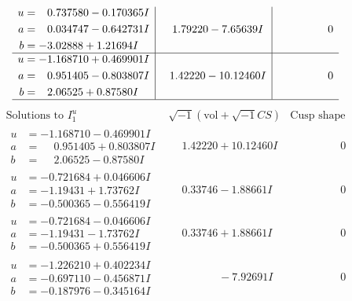 \documentclass[1p]{elsarticle_modified}
\theoremstyle{definition}
\newcommand{\I}{\sqrt{-1}}
\begin{document}
$$\begin{array}{c|c|c}
\begin{aligned}
u &= \phantom{-}0.737580 - 0.170365 I \\
a &= \phantom{-}0.034747 - 0.642731 I \\
b &= -3.02888 + 1.21694 I\end{aligned}
 & \phantom{-}1.79220 - 7.65639 I & \phantom{-0.000000 } 0 \\ \hline\begin{aligned}
u &= -1.168710 + 0.469901 I \\
a &= \phantom{-}0.951405 - 0.803807 I \\
b &= \phantom{-}2.06525 + 0.87580 I\end{aligned}
 & \phantom{-}1.42220 - 10.12460 I & \phantom{-0.000000 } 0\\
 \hline 
 \end{array}$$\newpage$$\begin{array}{c|c|c}  
\text{Solutions to }I^u_{1}& \I (\text{vol} + \sqrt{-1}CS) & \text{Cusp shape}\\
 \hline 
\begin{aligned}
u &= -1.168710 - 0.469901 I \\
a &= \phantom{-}0.951405 + 0.803807 I \\
b &= \phantom{-}2.06525 - 0.87580 I\end{aligned}
 & \phantom{-}1.42220 + 10.12460 I & \phantom{-0.000000 } 0 \\ \hline\begin{aligned}
u &= -0.721684 + 0.046606 I \\
a &= -1.19431 + 1.73762 I \\
b &= -0.500365 - 0.556419 I\end{aligned}
 & \phantom{-}0.33746 - 1.88661 I & \phantom{-0.000000 } 0 \\ \hline\begin{aligned}
u &= -0.721684 - 0.046606 I \\
a &= -1.19431 - 1.73762 I \\
b &= -0.500365 + 0.556419 I\end{aligned}
 & \phantom{-}0.33746 + 1.88661 I & \phantom{-0.000000 } 0 \\ \hline\begin{aligned}
u &= -1.226210 + 0.402234 I \\
a &= -0.697110 - 0.456871 I \\
b &= -0.187976 - 0.345164 I\end{aligned}
 & \phantom{-0.000000 } -7.92691 I & \phantom{-0.000000 } 0 \\ \hline\begin{aligned}

\end{aligned}
\end{array}$$
\end{document}
